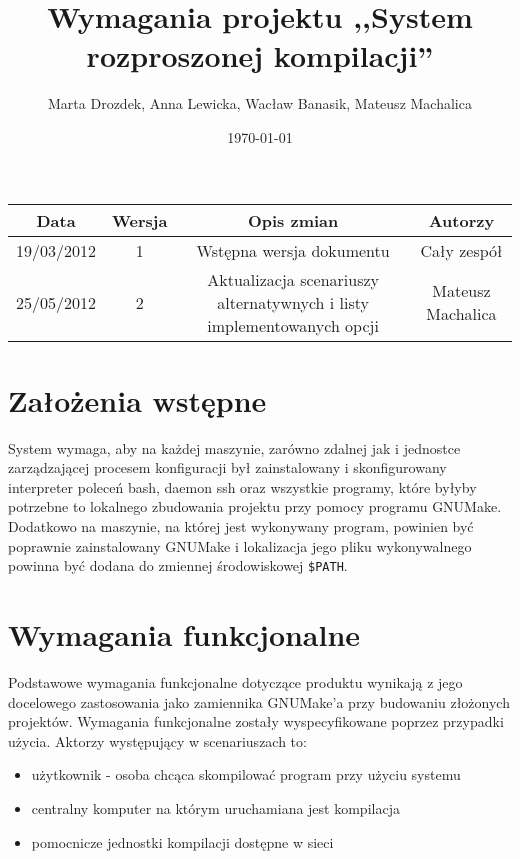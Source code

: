\documentclass[a4paper]{article}
\title{Wymagania projektu ,,System rozproszonej kompilacji''}
\author{Marta Drozdek, Anna Lewicka, Wacław Banasik, Mateusz Machalica}
\date{\today}
\begin{document}
\maketitle

\begin{table}[!h]
	\centering
	\begin{tabular}{|c|c|c|c|}
		\hline
		\textbf{Data} & \textbf{Wersja} & \textbf{Opis zmian} & \textbf{Autorzy} \\ \hline
		19/03/2012 & 1 & Wstępna wersja dokumentu & Cały zespół \\ \hline
		25/05/2012 & 2 & Aktualizacja scenariuszy alternatywnych i listy implementowanych opcji & Mateusz Machalica \\ \hline
	\end{tabular}
\end{table}

\section{Założenia wstępne}

System wymaga, aby na każdej maszynie, zarówno zdalnej jak i jednostce zarządzającej procesem konfiguracji był zainstalowany i skonfigurowany interpreter poleceń bash, daemon ssh oraz wszystkie programy, które byłyby potrzebne to lokalnego zbudowania projektu przy pomocy programu GNUMake. Dodatkowo na maszynie, na której jest wykonywany program, powinien być poprawnie zainstalowany GNUMake i lokalizacja jego pliku wykonywalnego powinna być dodana do zmiennej środowiskowej \verb+$PATH+.

\section{Wymagania funkcjonalne}

Podstawowe wymagania funkcjonalne dotyczące produktu wynikają z jego docelowego zastosowania jako zamiennika GNUMake’a przy budowaniu złożonych projektów. Wymagania funkcjonalne zostały wyspecyfikowane poprzez przypadki użycia. Aktorzy występujący w scenariuszach to:
\begin{itemize}
	\item użytkownik - osoba chcąca skompilować program przy użyciu systemu
	\item centralny komputer na którym uruchamiana jest kompilacja
	\item pomocnicze jednostki kompilacji dostępne w sieci
\end{itemize}
\end{document}
